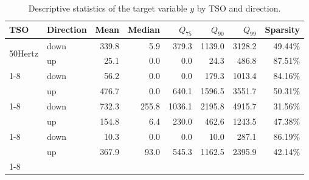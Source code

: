 \begin{table}
\caption{Descriptive statistics of the target variable $y$ by TSO and direction.}
\begin{tabular}{llrrrrrr}
\toprule
TSO & Direction & Mean & Median & $Q_{75}$ & $Q_{90}$ & $Q_{99}$ & Sparsity \\
\midrule
\multirow[t]{2}{*}{50Hertz} & down & 339.8 & 5.9 & 379.3 & 1139.0 & 3128.2 & 49.44\% \\
 & up & 25.1 & 0.0 & 0.0 & 24.3 & 486.8 & 87.51\% \\
\cline{1-8}
\multirow[t]{2}{*}{Amprion} & down & 56.2 & 0.0 & 0.0 & 179.3 & 1013.4 & 84.16\% \\
 & up & 476.7 & 0.0 & 640.1 & 1596.5 & 3551.7 & 50.31\% \\
\cline{1-8}
\multirow[t]{2}{*}{TenneT DE} & down & 732.3 & 255.8 & 1036.1 & 2195.8 & 4915.7 & 31.56\% \\
 & up & 154.8 & 6.4 & 230.0 & 462.6 & 1243.5 & 47.38\% \\
\cline{1-8}
\multirow[t]{2}{*}{TransnetBW} & down & 10.3 & 0.0 & 0.0 & 10.0 & 287.1 & 86.19\% \\
 & up & 367.9 & 93.0 & 545.3 & 1162.5 & 2395.9 & 42.14\% \\
\cline{1-8}
\bottomrule
\end{tabular}
\end{table}
